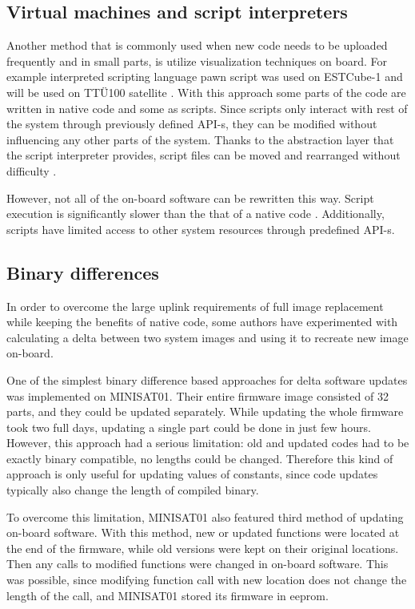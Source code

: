 \subsection{Virtual machines and script interpreters}

Another method that is commonly used when new code needs to be uploaded frequently and in small parts, is utilize visualization techniques on board. For example interpreted scripting language pawn script was used on ESTCube-1 \cite{Suenter2016} and will be used on TTÜ100 satellite \cite{Aasavaeli2017}. With this approach some parts of the code are written in native code and some as scripts. Since scripts only interact with rest of the system through previously defined API-s, they can be modified without influencing any other parts of the system. Thanks to the abstraction layer that the script interpreter provides, script files can be moved and rearranged without difficulty \cite{Riemersm}.

However, not all of the on-board software can be rewritten this way. Script execution is significantly slower than the that of a native code . Additionally, scripts have limited access to other system resources through predefined API-s.


\subsection{Binary differences}

In order to overcome the large uplink requirements of full image replacement while keeping the benefits of native code, some authors have experimented with calculating a delta between two system images and using it to recreate new image on-board.

One of the simplest binary difference based approaches for delta software updates was implemented on MINISAT01. Their entire firmware image consisted of 32 parts, and they could be updated separately. While updating the whole firmware took two full days, updating a single part could be done in just few hours. However, this approach had a serious limitation: old and updated codes had to be exactly binary compatible, no lengths could be changed. Therefore this kind of approach is only useful for updating values of constants, since code updates typically also change the length of compiled binary. \cite{Garrido1998}

To overcome this limitation, MINISAT01 also featured third method of updating on-board software. With this method, new or updated functions were located at the end of the firmware, while old versions were kept on their original locations. Then any calls to modified functions were changed in on-board software. This was possible, since modifying function call with new location does not change the length of the call, and MINISAT01 stored its firmware in \gls{eeprom}. \cite{Garrido1998} 

